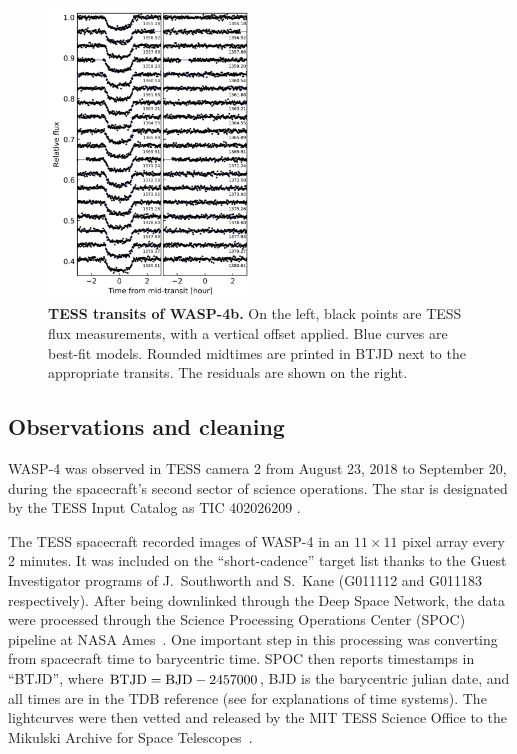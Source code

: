 \documentclass[12pt,twocolumn,tighten]{aastex62}
\begin{document}
\begin{figure}[t]
    \begin{center}
        \includegraphics[width=0.48\textwidth]{f1.png}
    \end{center}
    \vspace{-0.5cm}
    \caption{
        {\bf TESS transits of WASP-4b.} On the left, black points are
        TESS flux measurements, with a vertical offset applied. Blue
        curves are best-fit models. Rounded midtimes are printed in
        BTJD next to the appropriate transits.  The residuals are
        shown on the right.
        \label{fig:lightcurves}
    }
\end{figure}

\subsection{Observations and cleaning}
WASP-4 was observed in TESS camera 2 from August 23, 2018 to September
20, during the spacecraft's second sector of science operations.  The
star is designated by the TESS Input Catalog as TIC 402026209
\citep{stassun_TIC_2018}.

The TESS spacecraft recorded images of WASP-4 in an $11\times11$ pixel
array every 2 minutes.  It was included on the ``short-cadence'' target
list thanks to the Guest Investigator programs of J.\ Southworth and S.\
Kane (G011112 and G011183 respectively).  After being downlinked through
the Deep Space Network, the data were processed through the Science
Processing Operations Center (SPOC) pipeline at NASA
Ames~\citep{jenkins_tess_2016}.  One important step in this processing
was converting from spacecraft time to barycentric time.  SPOC then
reports timestamps in ``BTJD'', where ${\rm BTJD} = {\rm BJD} -
2457000$, BJD is the barycentric julian date, and all times are in the
TDB reference (see \citealt{urban_explanatory_2012} for explanations of
time systems).  The lightcurves were then vetted and released by the MIT
TESS Science Office to the Mikulski Archive for Space
Telescopes~\citep{ricker_tess_alerts_2018}.
\end{document}
